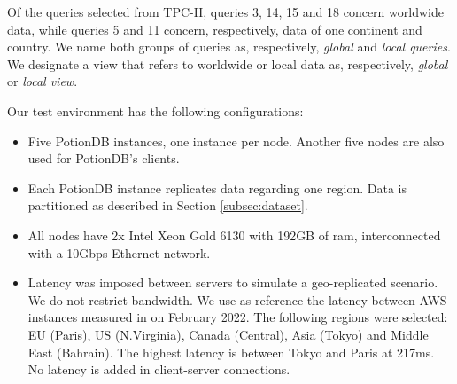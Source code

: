\documentclass[sigconf, nonacm]{acmart}
\newcommand{\andre}[1]{\nbnote{Andre}{blue}{#1}}
\begin{document}
Of the queries selected from TPC-H, queries 3, 14, 15 and 18 concern worldwide data, while queries 5 and 11 concern, respectively, data of one continent and country.
We name both groups of queries as, respectively, \textit{global} and \textit{local queries}.
We designate a view that refers to worldwide or local data as, respectively, \textit{global} or \textit{local view}.

Our test environment has the following configurations:

\begin{itemize}
	\item Five PotionDB instances, one instance per node.
	Another five nodes are also used for PotionDB's clients.
	\item Each PotionDB instance replicates data regarding one region. Data is partitioned as described in Section \ref{subsec:dataset}. 
	\item All nodes have 2x Intel Xeon Gold 6130 with 192GB of ram, interconnected with a 10Gbps Ethernet network. %
	\item Latency was imposed between servers to simulate a geo-replicated scenario.
	We do not restrict bandwidth. %
	We use as reference the latency between AWS instances measured in \cite{AWSLatency} on February 2022.
	The following regions were selected: EU (Paris), US (N.Virginia), Canada (Central), Asia (Tokyo) and Middle East (Bahrain). The highest latency is between Tokyo and Paris at 217ms.
	No latency is added in client-server connections. %

\end{itemize}
\end{document}
